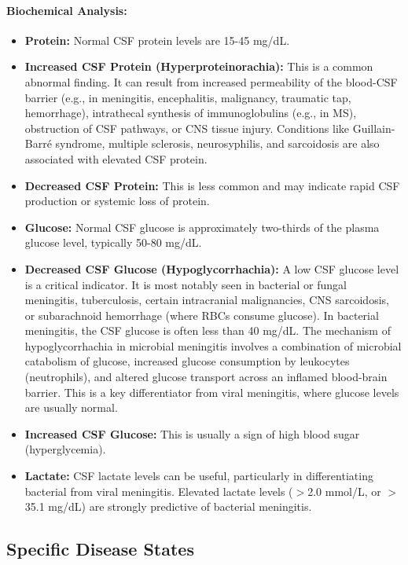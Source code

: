 	\paragraph{Biochemical Analysis:}
	\begin{itemize}
		\item \textbf{Protein:} Normal CSF protein levels are 15-45 mg/dL.
		\item \textbf{Increased CSF Protein (Hyperproteinorachia):} This is a common abnormal finding. It can result from increased permeability of the blood-CSF barrier (e.g., in meningitis, encephalitis, malignancy, traumatic tap, hemorrhage), intrathecal synthesis of immunoglobulins (e.g., in MS), obstruction of CSF pathways, or CNS tissue injury. Conditions like Guillain-Barré syndrome, multiple sclerosis, neurosyphilis, and sarcoidosis are also associated with elevated CSF protein.
		\item \textbf{Decreased CSF Protein:} This is less common and may indicate rapid CSF production or systemic loss of protein.
		\item \textbf{Glucose:} Normal CSF glucose is approximately two-thirds of the plasma glucose level, typically 50-80 mg/dL.
		\item \textbf{Decreased CSF Glucose (Hypoglycorrhachia):} A low CSF glucose level is a critical indicator. It is most notably seen in bacterial or fungal meningitis, tuberculosis, certain intracranial malignancies, CNS sarcoidosis, or subarachnoid hemorrhage (where RBCs consume glucose). In bacterial meningitis, the CSF glucose is often less than 40 mg/dL. The mechanism of hypoglycorrhachia in microbial meningitis involves a combination of microbial catabolism of glucose, increased glucose consumption by leukocytes (neutrophils), and altered glucose transport across an inflamed blood-brain barrier. This is a key differentiator from viral meningitis, where glucose levels are usually normal.
		\item \textbf{Increased CSF Glucose:} This is usually a sign of high blood sugar (hyperglycemia).
		\item \textbf{Lactate:} CSF lactate levels can be useful, particularly in differentiating bacterial from viral meningitis. Elevated lactate levels ($>$2.0 mmol/L, or $>$35.1 mg/dL) are strongly predictive of bacterial meningitis.
	\end{itemize}
	
	\subsection*{Specific Disease States}
	
